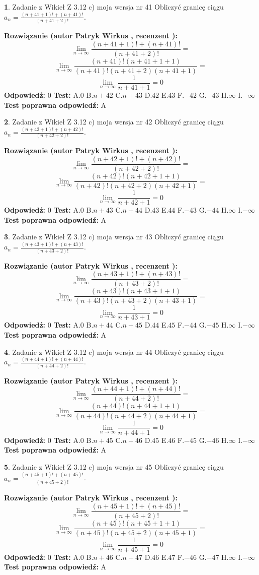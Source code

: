 \documentclass[12pt, a4paper]{article}
\theoremstyle{definition} %
\newtheorem{zad}{}
\newcommand{\zadStart}[1]{\begin{zad}#1\newline}
\newcommand{\zadStop}{\end{zad}}
\newcommand{\rozwStart}[2]{\noindent \textbf{Rozwiązanie (autor #1 , recenzent #2): }\newline}
\newcommand{\rozwStop}{\newline}
\newcommand{\odpStart}{\noindent \textbf{Odpowiedź:}\newline}
\newcommand{\odpStop}{\newline}
\newcommand{\testStart}{\noindent \textbf{Test:}\newline}
\newcommand{\testStop}{\newline}
\newcommand{\kluczStart}{\noindent \textbf{Test poprawna odpowiedź:}\newline}
\newcommand{\kluczStop}{\newline}
\begin{document}
\zadStart{Zadanie z Wikieł Z 3.12 c) moja wersja nr 41}
Obliczyć granicę ciągu $a_{n}=\frac{(n+41+1)!+(n+41)!}{(n+41+2)!}$.
\zadStop
\rozwStart{Patryk Wirkus}{}
$$\lim\limits_{n\to\infty}\frac{(n+41+1)!+(n+41)!}{(n+41+2)!}=$$
$$\lim\limits_{n\to\infty}\frac{(n+41)!(n+41+1+1)}{(n+41)!(n+41+2)(n+41+1)}=$$
$$\lim\limits_{n\to\infty}\frac{1}{n+41+1}= 0$$
\rozwStop
\odpStart
$0$
\odpStop
\testStart
A.$0$
B.$n+42$
C.$n+43$
D.$42$
E.$43$
F.$-42$
G.$-43$
H.$\infty$
I.$-\infty$
\testStop
\kluczStart
A
\kluczStop



\zadStart{Zadanie z Wikieł Z 3.12 c) moja wersja nr 42}
Obliczyć granicę ciągu $a_{n}=\frac{(n+42+1)!+(n+42)!}{(n+42+2)!}$.
\zadStop
\rozwStart{Patryk Wirkus}{}
$$\lim\limits_{n\to\infty}\frac{(n+42+1)!+(n+42)!}{(n+42+2)!}=$$
$$\lim\limits_{n\to\infty}\frac{(n+42)!(n+42+1+1)}{(n+42)!(n+42+2)(n+42+1)}=$$
$$\lim\limits_{n\to\infty}\frac{1}{n+42+1}= 0$$
\rozwStop
\odpStart
$0$
\odpStop
\testStart
A.$0$
B.$n+43$
C.$n+44$
D.$43$
E.$44$
F.$-43$
G.$-44$
H.$\infty$
I.$-\infty$
\testStop
\kluczStart
A
\kluczStop



\zadStart{Zadanie z Wikieł Z 3.12 c) moja wersja nr 43}
Obliczyć granicę ciągu $a_{n}=\frac{(n+43+1)!+(n+43)!}{(n+43+2)!}$.
\zadStop
\rozwStart{Patryk Wirkus}{}
$$\lim\limits_{n\to\infty}\frac{(n+43+1)!+(n+43)!}{(n+43+2)!}=$$
$$\lim\limits_{n\to\infty}\frac{(n+43)!(n+43+1+1)}{(n+43)!(n+43+2)(n+43+1)}=$$
$$\lim\limits_{n\to\infty}\frac{1}{n+43+1}= 0$$
\rozwStop
\odpStart
$0$
\odpStop
\testStart
A.$0$
B.$n+44$
C.$n+45$
D.$44$
E.$45$
F.$-44$
G.$-45$
H.$\infty$
I.$-\infty$
\testStop
\kluczStart
A
\kluczStop



\zadStart{Zadanie z Wikieł Z 3.12 c) moja wersja nr 44}
Obliczyć granicę ciągu $a_{n}=\frac{(n+44+1)!+(n+44)!}{(n+44+2)!}$.
\zadStop
\rozwStart{Patryk Wirkus}{}
$$\lim\limits_{n\to\infty}\frac{(n+44+1)!+(n+44)!}{(n+44+2)!}=$$
$$\lim\limits_{n\to\infty}\frac{(n+44)!(n+44+1+1)}{(n+44)!(n+44+2)(n+44+1)}=$$
$$\lim\limits_{n\to\infty}\frac{1}{n+44+1}= 0$$
\rozwStop
\odpStart
$0$
\odpStop
\testStart
A.$0$
B.$n+45$
C.$n+46$
D.$45$
E.$46$
F.$-45$
G.$-46$
H.$\infty$
I.$-\infty$
\testStop
\kluczStart
A
\kluczStop



\zadStart{Zadanie z Wikieł Z 3.12 c) moja wersja nr 45}
Obliczyć granicę ciągu $a_{n}=\frac{(n+45+1)!+(n+45)!}{(n+45+2)!}$.
\zadStop
\rozwStart{Patryk Wirkus}{}
$$\lim\limits_{n\to\infty}\frac{(n+45+1)!+(n+45)!}{(n+45+2)!}=$$
$$\lim\limits_{n\to\infty}\frac{(n+45)!(n+45+1+1)}{(n+45)!(n+45+2)(n+45+1)}=$$
$$\lim\limits_{n\to\infty}\frac{1}{n+45+1}= 0$$
\rozwStop
\odpStart
$0$
\odpStop
\testStart
A.$0$
B.$n+46$
C.$n+47$
D.$46$
E.$47$
F.$-46$
G.$-47$
H.$\infty$
I.$-\infty$
\testStop
\kluczStart
A
\kluczStop
\end{document}
